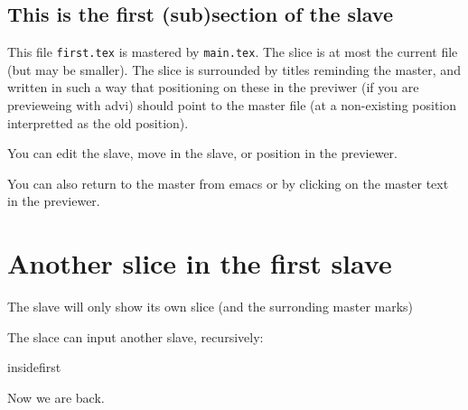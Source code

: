 \documentclass[main.tex]{subfiles}
\begin{document}
\subsection {This is the first (sub)section of the slave}

This file {\tt first.tex} is mastered by {\tt main.tex}.  The slice is at
most the current file (but may be smaller).  The slice is surrounded by
titles reminding the master, and written in such a way that positioning on
these in the previwer (if you are previeweing with advi) should point to the
master file (at a non-existing position interpretted as the old position).
 

You can edit the slave, move in the slave, or position in the previewer. 

You can also return to the master from emacs or by clicking on the master
text in the previewer. 

\section {Another slice in the first slave}

The slave will only show its own slice (and the surronding master marks)

The slace can input another slave, recursively:

 {insidefirst}

Now we are back.
\end{document}
